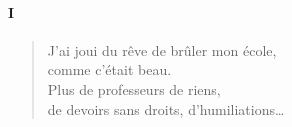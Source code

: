 



    	





  \paragraph*{I}
    \begin{verse}
      J’ai joui du rêve de brûler mon école,\\
      comme c’était beau.\\
      Plus de professeurs de riens,\\
      de devoirs sans droits, d’humiliations…
    \end{verse}
